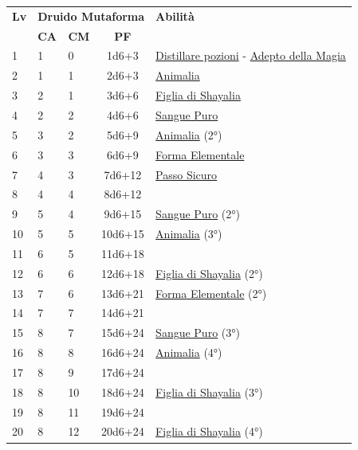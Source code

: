 {\begin{multicols}{2}


\noindent\begin{tabularx}{\linewidth}{p{0.3cm}|p{0.3cm}p{0.3cm}c|X|}
	\toprule
 \rowcolor{gray!20}	\textbf{Lv} & \multicolumn{3}{c|}{\textbf{Druido Mutaforma}} & \textbf{Abilità} \\
& \centering\arraybackslash \textbf{CA} & \centering\arraybackslash \textbf{CM} & \centering\arraybackslash \textbf{PF} & \\
	\toprule
	1 &1	& 0	&	1d6+3	&\hyperlink{Distillare pozioni}{Distillare pozioni} - \hyperlink{Adepto della Magia}{Adepto della Magia}\\
 \rowcolor{gray!20}2	&	1	& 1	&	2d6+3	&\hyperlink{Animalia}{Animalia}\\
	3	&	2	& 1	&	3d6+6	&\hyperlink{Figlia di Shayalia}{Figlia di Shayalia}\\
 \rowcolor{gray!20}4	&	2	& 2	&	4d6+6	&\hyperlink{Sangue Puro}{Sangue Puro}\\
	5	&	3	& 2	&	5d6+9	&\hyperlink{Animalia}{Animalia} (2°)\\
 \rowcolor{gray!20}6	&	3	& 3	&	6d6+9	&\hyperlink{Forma Elementale}{Forma Elementale}\\
	7	&	4	& 3	&	7d6+12	&\hyperlink{Passo Sicuro}{Passo Sicuro}\\
 \rowcolor{gray!20}8	&	4	& 4	&	8d6+12	&\\
	9	&	5	& 4	&	9d6+15	&\hyperlink{Sangue Puro}{Sangue Puro} (2°)\\
 \rowcolor{gray!20}10	&	5	& 5	&	10d6+15	&\hyperlink{Animalia}{Animalia} (3°)\\
	11	&	6	& 5	&	11d6+18	&\\
 \rowcolor{gray!20}12	&	6	& 6	&	12d6+18	&\hyperlink{Figlia di Shayalia}{Figlia di Shayalia} (2°)\\
	13	&	7	& 6	&	13d6+21	&\hyperlink{Forma Elementale}{Forma Elementale} (2°)\\
 \rowcolor{gray!20}14	&	7	& 7	&	14d6+21	&\\
	15	&	8	& 7	&	15d6+24	&\hyperlink{Sangue Puro}{Sangue Puro} (3°)\\
 \rowcolor{gray!20}16	&	8	& 8	&	16d6+24	&\hyperlink{Animalia}{Animalia} (4°)\\
	17	&	8	& 9	&	17d6+24	&\\
 \rowcolor{gray!20}18	&	8	& 10	&	18d6+24	&\hyperlink{Figlia di Shayalia}{Figlia di Shayalia} (3°)\\
	19	&	8	& 11	&	19d6+24	&\\
 \rowcolor{gray!20}20	&	8	& 12	&	20d6+24	&\hyperlink{Figlia di Shayalia}{Figlia di Shayalia} (4°)\\
\end{tabularx}



\end{multicols}}
